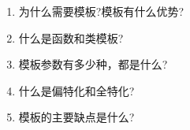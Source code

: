 \begin{enumerate}
\item
为什么需要模板?模板有什么优势?

\item
什么是函数和类模板?

\item
模板参数有多少种，都是什么?

\item
什么是偏特化和全特化?

\item
模板的主要缺点是什么?
\end{enumerate}